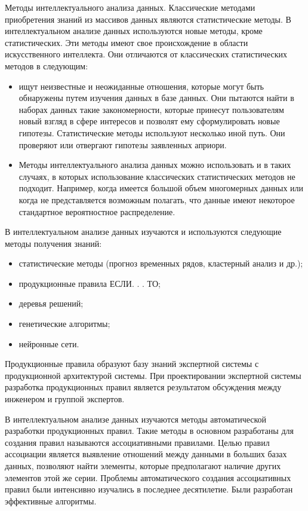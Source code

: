 Методы интеллектуального анализа данных.
Классические методами приобретения знаний из массивов данных являются статистические методы. 
В интеллектуальном анализе данных используются новые методы, кроме статистических. Эти методы имеют свое происхождение в области искусственного интеллекта. Они отличаются от классических статистических методов в следующим:
\begin{itemize}
\item ищут неизвестные и неожиданные отношения, которые могут быть обнаружены путем изучения данных в базе данных. Они пытаются найти в наборах данных такие закономерности, которые принесут пользователям новый взгляд в сфере интересов и позволят ему сформулировать новые гипотезы. Статистические методы используют несколько иной путь. Они проверяют или отвергают гипотезы заявленных априори.
\item Методы интеллектуального анализа данных можно использовать и в таких случаях, в которых 
использование классических статистических методов не подходит. Например, когда имеется большой объем 
многомерных данных  или когда не представляется возможным полагать, что данные имеют некоторое стандартное 
вероятностное распределение.
\end{itemize}
В интеллектуальном анализе данных изучаются и используются следующие методы получения знаний:
\begin{itemize}
\item статистические методы (прогноз временных рядов, кластерный анализ и др.);
\item продукционные правила ЕСЛИ. . . ТО;
\item деревья решений;
\item генетические алгоритмы;
\item нейронные сети.
\end{itemize}

Продукционные правила образуют базу знаний экспертной системы с продукционной архитектурой системы. При проектировании экспертной системы разработка продукционных правил является результатом обсуждения между инженером и группой экспертов.
 
 В интеллектуальном анализе данных изучаются методы автоматической разработки продукционных правил.
Такие методы в основном разработаны для создания правил называются ассоциативными правилами.
Целью правил ассоциации является выявление отношений между данными в больших базах данных, позволяют найти
элементы, которые предполагают наличие других элементов этой же серии.
Проблемы автоматического создания ассоциативных правил были интенсивно изучались в последнее десятилетие. 
Были разработан эффективные алгоритмы.

